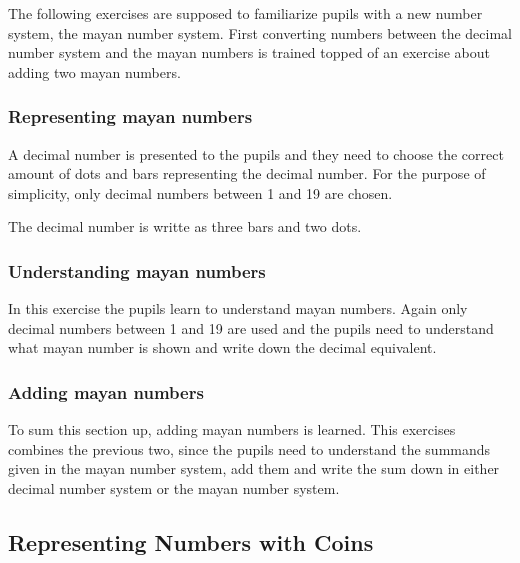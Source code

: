 The following exercises are supposed to familiarize pupils with a new number system, the mayan number system. First converting numbers between the decimal number system and the mayan numbers is trained topped of an exercise about adding two mayan numbers.

\subsubsection*{Representing mayan numbers}

A decimal number is presented to the pupils and they need to choose the correct amount of dots and bars representing the decimal number. For the purpose of simplicity, only decimal numbers between 1 and 19 are chosen.

\begin{example}
    The decimal number  is writte as three bars and two dots.
\end{example}

\subsubsection*{Understanding mayan numbers}

In this exercise the pupils learn to understand mayan numbers. Again only decimal numbers between 1 and 19 are used and the pupils need to understand what mayan number is shown and write down the decimal equivalent.

\subsubsection*{Adding mayan numbers}

To sum this section up, adding mayan numbers is learned. This exercises combines the previous two, since the pupils need to understand the summands given in the mayan number system, add them and write the sum down in either decimal number system or the mayan number system.

\subsection*{Representing Numbers with Coins}


